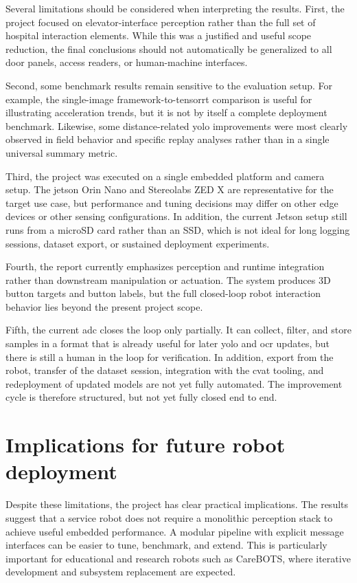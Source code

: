 Several limitations should be considered when interpreting the results. First,
the project focused on elevator-interface perception rather than the full set of
hospital interaction elements. While this was a justified and useful scope
reduction, the final conclusions should not automatically be generalized to all
door panels, access readers, or human-machine interfaces.

Second, some benchmark results remain sensitive to the evaluation setup. For
example, the single-image framework-to-\gls{tensorrt} comparison is useful for
illustrating acceleration trends, but it is not by itself a complete deployment
benchmark. Likewise, some distance-related \gls{yolo} improvements were most
clearly observed in field behavior and specific replay analyses rather than in a
single universal summary metric.

Third, the project was executed on a single embedded platform and camera setup.
The \gls{jetson} Orin Nano and Stereolabs ZED X are representative for the
target use case, but performance and tuning decisions may differ on other edge
devices or other sensing configurations. In addition, the current Jetson setup
still runs from a microSD card rather than an SSD, which is not ideal for long
logging sessions, dataset export, or sustained deployment experiments.

Fourth, the report currently emphasizes perception and runtime integration rather
than downstream manipulation or actuation. The system produces 3D button targets
and button labels, but the full closed-loop robot interaction behavior lies
beyond the present project scope.

Fifth, the current \gls{adc} closes the loop only partially. It can collect,
filter, and store samples in a format that is already useful for later \gls{yolo}
and \gls{ocr} updates, but there is still a human in the loop for verification.
In addition, export from the robot, transfer of the dataset session, integration
with the \gls{cvat} tooling, and redeployment of updated models are not yet
fully automated. The improvement cycle is therefore structured, but not yet
fully closed end to end.

\section{Implications for future robot deployment}

Despite these limitations, the project has clear practical implications. The
results suggest that a service robot does not require a monolithic perception
stack to achieve useful embedded performance. A modular pipeline with explicit
message interfaces can be easier to tune, benchmark, and extend. This is
particularly important for educational and research robots such as CareBOTS, where
iterative development and subsystem replacement are expected.

